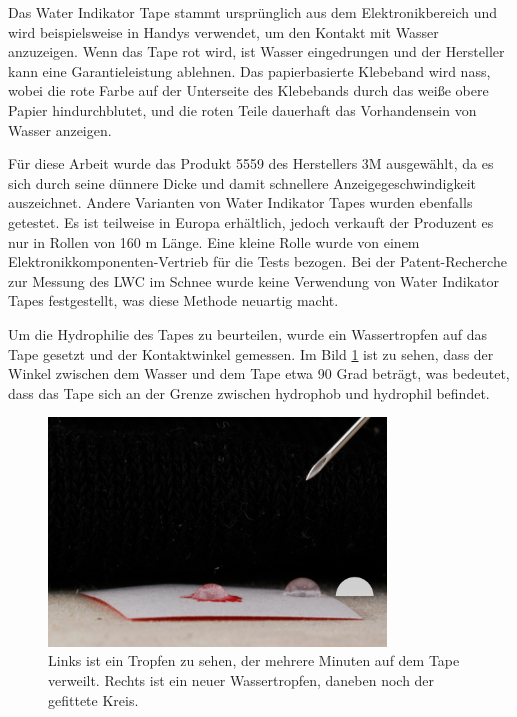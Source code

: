 Das Water Indikator Tape stammt ursprünglich aus dem Elektronikbereich und wird beispielsweise in Handys verwendet, um den Kontakt mit Wasser anzuzeigen. Wenn das Tape rot wird, ist Wasser eingedrungen und der Hersteller kann eine Garantieleistung ablehnen. Das papierbasierte Klebeband wird nass, wobei die rote Farbe auf der Unterseite des Klebebands durch das weiße obere Papier hindurchblutet, und die roten Teile dauerhaft das Vorhandensein von Wasser anzeigen.

Für diese Arbeit wurde das Produkt 5559 des Herstellers 3M ausgewählt, da es sich durch seine dünnere Dicke und damit schnellere Anzeigegeschwindigkeit auszeichnet. Andere Varianten von Water Indikator Tapes wurden ebenfalls getestet. Es ist teilweise in Europa erhältlich, jedoch verkauft der Produzent es nur in Rollen von 160 m Länge. Eine kleine Rolle wurde von einem Elektronikkomponenten-Vertrieb für die Tests bezogen. Bei der Patent-Recherche zur Messung des LWC im Schnee wurde keine Verwendung von Water Indikator Tapes festgestellt, was diese Methode neuartig macht.

Um die Hydrophilie des Tapes zu beurteilen, wurde ein Wassertropfen auf das Tape gesetzt und der Kontaktwinkel gemessen. Im Bild \ref{fig:winkTropf} ist zu sehen, dass der Winkel zwischen dem Wasser und dem Tape etwa 90 Grad beträgt, was bedeutet, dass das Tape sich an der Grenze zwischen hydrophob und hydrophil befindet.

\begin{figure}
    \centering
    \includegraphics[width=0.8\textwidth]{Bilder/IMG_6683.JPG}
    \caption{Links ist ein Tropfen zu sehen, der mehrere Minuten auf dem Tape verweilt. Rechts ist ein neuer Wassertropfen, daneben noch der gefittete Kreis.} 
    \label{fig:winkTropf}
\end{figure}

\iffalse

